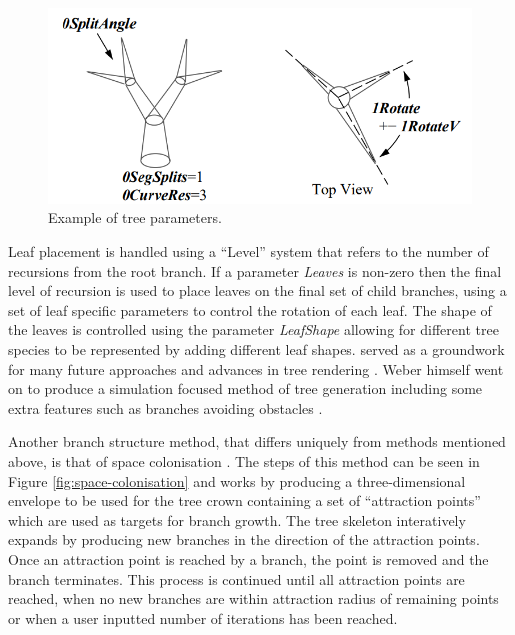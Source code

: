 \documentclass[final]{cmpreport}
\begin{document}
\begin{figure}[ht]
    \includegraphics[scale=0.5]{weber-splits.PNG} 
    \centering
    \captionsetup{justification=centering}
    \caption{Example of tree parameters.}
    \label{fig:weber-splits}
\end{figure}

Leaf placement is handled using a ``Level'' system that refers to the number of recursions from 
the root branch. If a parameter \emph{Leaves} is non-zero then the final level of recursion is 
used to place leaves on the final set of child branches, using a set of leaf specific parameters 
to control the rotation of each leaf. The shape of the leaves is controlled using the parameter 
\emph{LeafShape} allowing for different tree species to be represented by adding different leaf 
shapes.
\cite{weber1995rendering} served as a groundwork for many future approaches and advances in tree 
rendering \citep{remolar2004rendering,wesslen2005real}. Weber himself went on to produce a 
simulation focused method of tree generation including some extra features such as branches 
avoiding obstacles \citep{weber2008simulation}.

Another branch structure method, that differs uniquely from methods mentioned above, is that of 
space colonisation \citep{runions2007colonization}. The steps of this method can be seen in Figure \ref{fig:space-colonisation} 
and works by producing a three-dimensional envelope to be used for the tree crown containing a set 
of ``attraction points'' which are used as targets for branch growth. The tree skeleton interatively 
expands by producing new branches in the direction of the attraction points. Once an attraction point 
is reached by a branch, the point is removed and the branch terminates. This process is continued 
until all attraction points are reached, when no new branches are within attraction radius of 
remaining points or when a user inputted number of iterations has been reached. 
\end{document}
